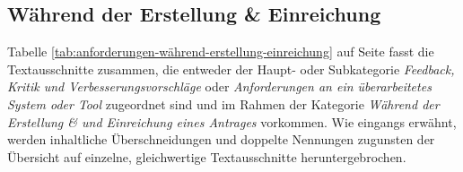 \documentclass[a4paper,12pt,twoside]{scrreprt}
\begin{document}
\subsection{Während der Erstellung \& Einreichung}
\label{sub-sec:während-erstellung-einreichung}

Tabelle \ref{tab:anforderungen-während-erstellung-einreichung} auf Seite \pageref{tab:anforderungen-während-erstellung-einreichung} fasst die Textausschnitte zusammen, die entweder der Haupt- oder Subkategorie \textit{Feedback, Kritik und Verbesserungsvorschläge} oder \textit{Anforderungen an ein überarbeitetes System oder Tool} zugeordnet sind und im Rahmen der Kategorie \textit{Während der Erstellung \& und Einreichung eines Antrages} vorkommen. Wie eingangs erwähnt, werden inhaltliche Überschneidungen und doppelte Nennungen zugunsten der Übersicht auf einzelne, gleichwertige Textausschnitte heruntergebrochen.
\end{document}
